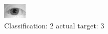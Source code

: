 \begin{figure}[h!]
\begin{center}
\includegraphics[width=0.60\columnwidth]{figures/ID1169_class_2_target_3.png}
\end{center}
\caption{ Classification: 2 actual target: 3}
\label{fig:ID1169_class_2_target_3}
\end{figure}
